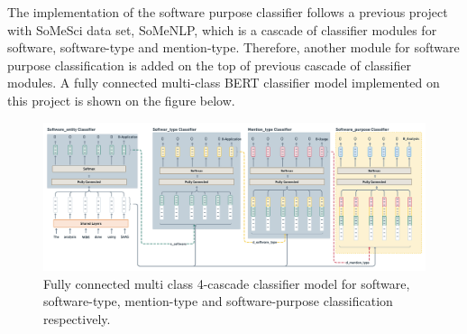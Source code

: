 The implementation of the software purpose classifier follows a previous project with SoMeSci data set, SoMeNLP, which is a cascade of classifier modules for software, software-type and mention-type. Therefore, another module for software purpose classification is added on the top of previous cascade of classifier modules. A fully connected multi-class BERT classifier model implemented on this project is  shown on the figure below. 

\begin{figure}[htbp]
	\centering
	\includegraphics[width=1\textwidth]{4.graphics/figures/ch_5/fully_connected_model}
	\caption{Fully connected multi class 4-cascade classifier model for software, software-type, mention-type and software-purpose classification respectively.}
	\label{fig:chapter05:setup}
\end{figure}

 


